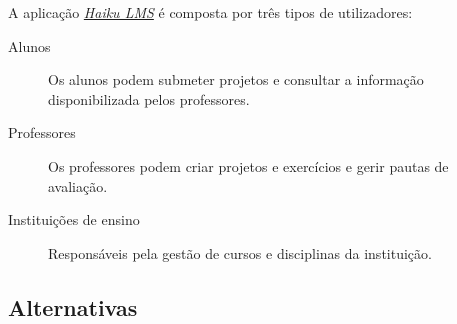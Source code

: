 A aplicação \href{http://www.haikulearning.com/}{\emph{Haiku LMS}} é composta por três tipos de utilizadores:

\begin{description}
	\item[Alunos] Os alunos podem submeter projetos e consultar a informação disponibilizada pelos professores.
	\item[Professores] Os professores podem criar projetos e exercícios e gerir pautas de avaliação.
	\item[Instituições de ensino] Responsáveis pela gestão de cursos e disciplinas da instituição.
\end{description}

\subsection{Alternativas} %
\label{sub:alternativas}

